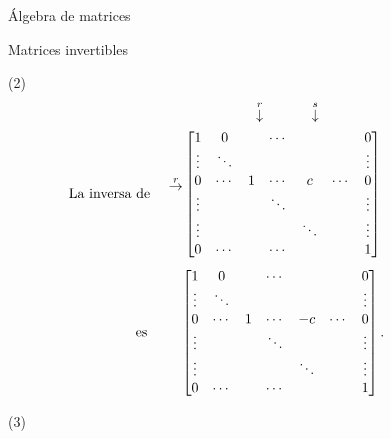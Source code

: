 \begin{chapter}{\'Algebra de matrices}
\begin{section}{Matrices invertibles}
\begin{ejemplo*}
            (2)
            \begin{align*}
            &\begin{matrix}
            {}^{}&{}^{}&{}^{}&{}^{}&{}^{}&\overset{r}{\downarrow}&{}^{}&{}^{}&{}^{}{}^{}\overset{s}{\downarrow}&{}^{}
            \end{matrix} \\
            \text{La inversa de \quad}
            \begin{matrix}
            {}^{}\\{}^{}\\
            \overset{r}{\to}\\
            {}^{}\\
            {}^{}\\
            {}^{}
            \end{matrix}
            &\begin{bmatrix}
            1 & 0 &  &\cdots &&& 0  \\
            \vdots  & \ddots  & & &&& \vdots \\
            0 & \cdots &1 &\cdots&c&\cdots &0 \\
            \vdots  &   & &\ddots &&& \vdots \\
            \vdots  &   & & &\ddots&& \vdots \\
            0  & \cdots  & &\cdots &&& 1
            \end{bmatrix}\qquad\qquad\quad
        \end{align*}
        \begin{equation*}
            \text{es \qquad}
            \begin{bmatrix}
            1 & 0 &  &\cdots &&& 0  \\
            \vdots  & \ddots  & & &&& \vdots \\
            0 & \cdots &1 &\cdots&-c&\cdots &0 \\
            \vdots  &   & &\ddots &&& \vdots \\
            \vdots  &   & & &\ddots&& \vdots \\
            0  & \cdots  & &\cdots &&& 1
            \end{bmatrix}. 
        \end{equation*}
            
            
            
            (3)
            

\end{ejemplo*}
\end{section}
\end{chapter}
